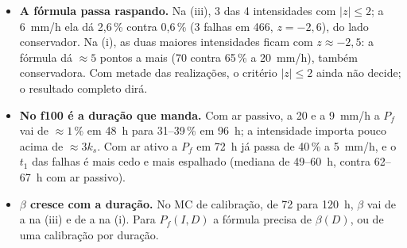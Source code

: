 \documentclass[11pt,a4paper]{article}
\newcommand{\Pf}{P_f}
\begin{document}
\begin{table}[H]\centering\small
\caption{O f100 no \texttt{frag}: o prefixo contínuo de \fragCemNiii{} realizações na (iii) e \fragCemNi{} na (i), de
1000. $F$: o FS das médias em 72~h. $\Pf$: a falha até 72~h, com o IC de 95\,\%; prev.: a fórmula com o $\beta$ e o $m$
da calibração, e $z$ como na Tab.~\ref{tab:fragiii}. 48, 60 e 96~h: a $\Pf$ (\%) para essas durações, pela mesma
primeira passagem. $t_1$: a mediana e os quantis de 10 e 90\,\% das falhas até 72~h.}\label{tab:fragf100}
\resizebox{\textwidth}{!}{}
\end{table}

\begin{itemize}
  \item \textbf{A fórmula passa raspando.} Na (iii), 3 das 4 intensidades com $|z| \le 2$; a 6~mm/h ela dá 2,6\,\%
    contra 0,6\,\% (3 falhas em 466, $z = -2{,}6$), do lado conservador. Na (i), as duas maiores intensidades ficam
    com $z \approx -2{,}5$: a fórmula dá $\approx 5$ pontos a mais (70 contra 65\,\% a 20~mm/h), também conservadora.
    Com metade das realizações, o critério $|z| \le 2$ ainda não decide; o resultado completo dirá.
  \item \textbf{No f100 é a duração que manda.} Com ar passivo, a 20 e a 9~mm/h a $\Pf$ vai de $\approx 1\,\%$ em
    48~h para 31--39\,\% em 96~h; a intensidade importa pouco acima de $\approx 3k_s$. Com ar ativo a $\Pf$ em 72~h
    já passa de 40\,\% a 5~mm/h, e o $t_1$ das falhas é mais cedo e mais espalhado (mediana de 49--60~h, contra 62--67~h
    com ar passivo).
  \item \textbf{$\beta$ cresce com a duração.} No MC de calibração, de 72 para 120~h, $\beta$ vai de \fragCemBetaiii{}
    a \fragCemBetaCxxiii{} na (iii) e de \fragCemBetai{} a \fragCemBetaCxxi{} na (i). Para $\Pf(I, D)$ a fórmula
    precisa de $\beta(D)$, ou de uma calibração por duração.
\end{itemize}
\fi
\end{document}
